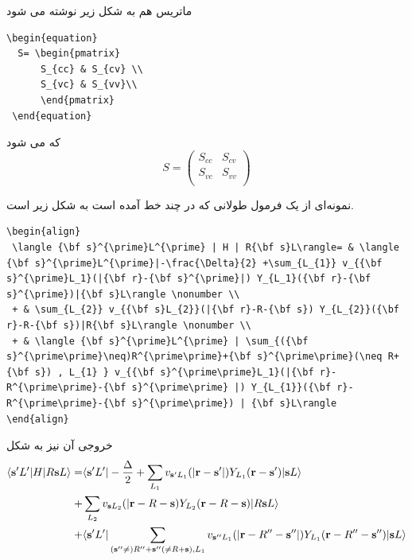ماتریس هم به شکل زیر نوشته می شود
 \begin{latin}
\begin{lstlisting}[style=Tex]
 \begin{equation}
  S= \begin{pmatrix}
      S_{cc} & S_{cv} \\
      S_{vc} & S_{vv}\\
      \end{pmatrix}
 \end{equation}
\end{lstlisting}
\end{latin}
که می شود
 \begin{equation}
  S=
 \begin{pmatrix}
 S_{cc} & S_{cv} \\
 S_{vc} & S_{vv}\\
 \end{pmatrix}
 \end{equation}
 
 نمونه‌ای از یک فرمول طولانی که در چند خط آمده  است به شکل زیر است.
  \begin{latin}
\begin{lstlisting}[style=Tex]
 \begin{align}
 \langle {\bf s}^{\prime}L^{\prime} | H | R{\bf s}L\rangle= & \langle {\bf s}^{\prime}L^{\prime}|-\frac{\Delta}{2} +\sum_{L_{1}} v_{{\bf s}^{\prime}L_1}(|{\bf r}-{\bf s}^{\prime}|) Y_{L_1}({\bf r}-{\bf s}^{\prime})|{\bf s}L\rangle \nonumber \\
 + & \sum_{L_{2}} v_{{\bf s}L_{2}}(|{\bf r}-R-{\bf s}) Y_{L_{2}}({\bf r}-R-{\bf s})|R{\bf s}L\rangle \nonumber \\
 + & \langle {\bf s}^{\prime}L^{\prime} | \sum_{({\bf s}^{\prime\prime}\neq)R^{\prime\prime}+{\bf s}^{\prime\prime}(\neq R+{\bf s}) , L_{1} } v_{{\bf s}^{\prime\prime}L_1}(|{\bf r}-R^{\prime\prime}-{\bf s}^{\prime\prime} |) Y_{L_{1}}({\bf r}-R^{\prime\prime}-{\bf s}^{\prime\prime}) | {\bf s}L\rangle
\end{align}
\end{lstlisting}
\end{latin}
خروجی آن نیز به شکل 
 \begin{align}
 \langle {\bf s}^{\prime}L^{\prime} | H | R{\bf s}L\rangle= & \langle {\bf s}^{\prime}L^{\prime}|-\frac{\Delta}{2} +\sum_{L_{1}} v_{{\bf s}^{\prime}L_1}(|{\bf r}-{\bf s}^{\prime}|) Y_{L_1}({\bf r}-{\bf s}^{\prime})|{\bf s}L\rangle \nonumber \\
 + & \sum_{L_{2}} v_{{\bf s}L_{2}}(|{\bf r}-R-{\bf s}) Y_{L_{2}}({\bf r}-R-{\bf s})|R{\bf s}L\rangle \nonumber \\
 + & \langle {\bf s}^{\prime}L^{\prime} | \sum_{({\bf s}^{\prime\prime}\neq)R^{\prime\prime}+{\bf s}^{\prime\prime}(\neq R+{\bf s}) , L_{1} } v_{{\bf s}^{\prime\prime}L_1}(|{\bf r}-R^{\prime\prime}-{\bf s}^{\prime\prime} |) Y_{L_{1}}({\bf r}-R^{\prime\prime}-{\bf s}^{\prime\prime}) | {\bf s}L\rangle
\end{align}
 
